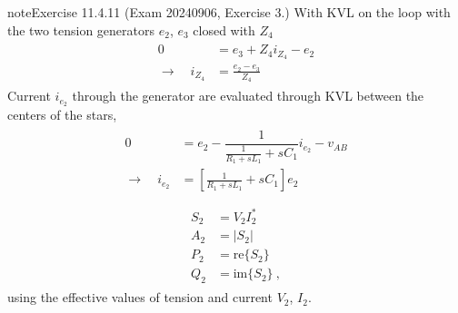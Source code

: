\documentclass[letterpaper,10pt,english]{jupyterBook}
\begin{document}
\begin{sphinxadmonition}{note}{Exercise 11.4.11 (Exam 2024\sphinxhyphen{}09\sphinxhyphen{}06, Exercise 3.)}
\sphinxAtStartPar
{} With KVL on the loop with the two tension generators \(e_2\), \(e_3\) closed with \(Z_4\)
\begin{equation*}
\begin{split}\begin{aligned}
  0 & = e_3 + Z_4 i_{Z_4} - e_2 \\
  \rightarrow \quad i_{Z_4} & = \frac{e_2 - e_3}{Z_4}
\end{aligned}\end{split}
\end{equation*}
\sphinxAtStartPar
{} Current \(i_{e_2}\) through the generator are evaluated through KVL between the centers of the stars,
\begin{equation*}
\begin{split}\begin{aligned}
  0
  & = e_2 - \dfrac{1}{\frac{1}{R_1 + s L_1} + s C_1 } i_{e_2} - v_{AB} \\
  \rightarrow \quad i_{e_2} & = \left[ \frac{1}{R_1 + s L_1} + s C_1 \right] e_2 \\
\end{aligned}\end{split}
\end{equation*}
\sphinxAtStartPar
{}
\begin{equation*}
\begin{split}\begin{aligned}
  S_2 & = V_2 I_2^* \\
  A_2 & = |S_2| \\
  P_2 & = \text{re} \{ S_2 \} \\
  Q_2 & = \text{im} \{ S_2 \} \ ,
\end{aligned}\end{split}
\end{equation*}
\sphinxAtStartPar
using the effective values of tension and current \(V_2\), \(I_2\).
\end{sphinxadmonition}
 \label{exercise:exam-24-07-22-exe-03}
\end{document}
